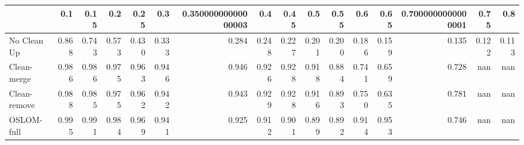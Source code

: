 \begin{tabular}{lrrrrrrrrrrrrrrr}
\toprule
{} &   0.1 &  0.15 &   0.2 &  0.25 &   0.3 & 0.35000000000000003 &   0.4 &  0.45 &   0.5 &  0.55 &   0.6 &  0.65 & 0.7000000000000001 &  0.75 &   0.8 \\
\midrule
No Clean Up  & 0.868 & 0.743 & 0.573 & 0.430 & 0.333 &               0.284 & 0.248 & 0.227 & 0.201 & 0.200 & 0.186 & 0.159 &              0.135 & 0.122 & 0.113 \\
Clean-merge  & 0.986 & 0.986 & 0.975 & 0.963 & 0.946 &               0.946 & 0.926 & 0.928 & 0.918 & 0.884 & 0.741 & 0.659 &              0.728 &   nan &   nan \\
Clean-remove & 0.988 & 0.985 & 0.975 & 0.962 & 0.942 &               0.943 & 0.929 & 0.928 & 0.916 & 0.893 & 0.750 & 0.635 &              0.781 &   nan &   nan \\
OSLOM-full   & 0.995 & 0.991 & 0.984 & 0.969 & 0.941 &               0.925 & 0.912 & 0.901 & 0.899 & 0.892 & 0.914 & 0.953 &              0.746 &   nan &   nan \\
\bottomrule
\end{tabular}
